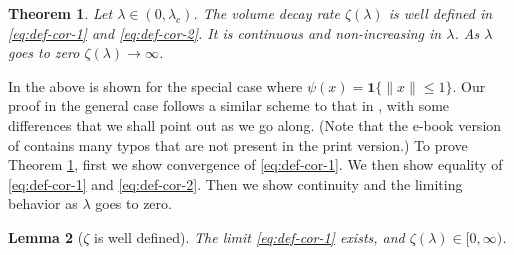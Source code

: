 \documentclass[a4paper,12pt]{scrartcl}
\newcommand{\conn}{\psi}
\newtheorem{theorem}{Theorem}[section]
\newtheorem{lemma}[theorem]{Lemma}
\theoremstyle{definition}
\theoremstyle{remark}
\begin{document}
  \begin{theorem} \label{thm:zeta-prop}
    Let $\lambda\in(0,\lambda_c)$.
    The volume decay rate $\zeta(\lambda)$ is well defined in
    \eqref{eq:def-cor-1} and \eqref{eq:def-cor-2}.
    It is continuous and non-increasing in $\lambda$. As $\lambda$ goes to zero $\zeta(\lambda)\to \infty$.
  \end{theorem}

  In \cite[Theorem 10.1]{penrose2003random} the above is shown for the special case where $\conn(x)=\mathbf{1}\{\|x\|\leq 1\}$. Our proof in the general case follows a similar scheme to that in \cite{penrose2003random},
  with some differences that we shall point out as we go along.
  (Note that the e-book version of \cite{penrose2003random} contains many typos that are not present in the print version.)
  To prove Theorem \ref{thm:zeta-prop},
  first we show convergence of \eqref{eq:def-cor-1}. We then show equality of \eqref{eq:def-cor-1} and \eqref{eq:def-cor-2}.  Then we show continuity and the limiting behavior as $\lambda$ goes to zero.
  \begin{lemma}[$\zeta$ is well defined]\label{lem:conv-zeta}
    The limit \eqref{eq:def-cor-1} exists, and $\zeta(\lambda)\in[0,\infty)$.
  \end{lemma}
\end{document}
